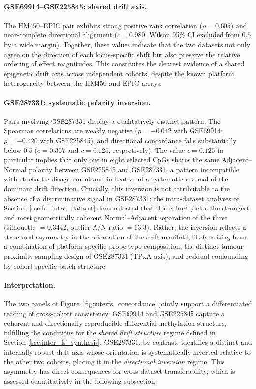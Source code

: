 \paragraph{GSE69914--GSE225845: shared drift axis.}
The HM$450$--EPIC pair exhibits strong positive rank correlation
($\rho = 0.605$) and near-complete directional alignment
($c = 0.980$, Wilson 95\% CI excluded from $0.5$ by a wide margin).
Together, these values indicate that the two datasets not only
agree on the direction of each locus-specific shift but also
preserve the relative ordering of effect magnitudes.
This constitutes the clearest evidence of a shared epigenetic
drift axis across independent cohorts, despite the known
platform heterogeneity between the HM$450$ and EPIC arrays.

\paragraph{GSE287331: systematic polarity inversion.}
Pairs involving GSE287331 display a qualitatively distinct pattern.
The Spearman correlations are weakly negative
($\rho = -0.042$ with GSE69914; $\rho = -0.420$ with GSE225845),
and directional concordance falls substantially below $0.5$
($c = 0.357$ and $c = 0.125$, respectively).
The value $c = 0.125$ in particular implies that only one in
eight selected CpGs shares the same Adjacent--Normal polarity
between GSE225845 and GSE287331, a pattern incompatible with
stochastic disagreement and indicative of a systematic reversal
of the dominant drift direction.
Crucially, this inversion is not attributable to the absence of a
discriminative signal in GSE287331: the intra-dataset analyses of
Section~\ref{sec:fs_intra_dataset} demonstrated that this cohort
yields the strongest and most geometrically coherent Normal--Adjacent
separation of the three (silhouette $= 0.3442$; outlier A/N ratio
$= 13.3$).
Rather, the inversion reflects a structural asymmetry in the
orientation of the drift manifold, likely arising from a combination
of platform-specific probe-type composition, the distinct
tumour-proximity sampling design of GSE287331 (TPxA axis), and
residual confounding by cohort-specific batch structure.

\paragraph{Interpretation.}
The two panels of Figure~\ref{fig:interfs_concordance} jointly
support a differentiated reading of cross-cohort consistency.
GSE69914 and GSE225845 capture a coherent and directionally
reproducible differential methylation structure, fulfilling the
conditions for the \emph{shared drift structure} regime
defined in Section~\ref{sec:inter_fs_synthesis}.
GSE287331, by contrast, identifies a distinct and internally robust
drift axis whose orientation is systematically inverted relative
to the other two cohorts, placing it in the \emph{directional
inversion} regime.
This asymmetry has direct consequences for cross-dataset
transferability, which is assessed quantitatively in the following subsection.

